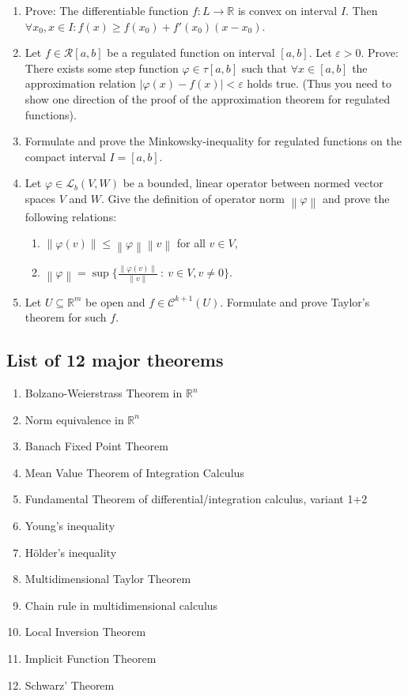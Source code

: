 \documentclass{article}
\newcommand{\norm}[1]{\left\|#1\right\|}
\newcommand{\card}[1]{\left|#1\right|}
\begin{document}
\begin{enumerate}
  \item Prove: The differentiable function $f: L \to \mathbb R$ is convex on interval $I$. Then $\forall x_0, x \in I: f(x) \geq f(x_0) + f'(x_0)(x - x_0)$.
  \item Let $f \in \mathcal R[a, b]$ be a regulated function on interval $[a, b]$. Let $\varepsilon > 0$. Prove: There exists some step function $\varphi \in \tau[a, b]$ such that $\forall x \in [a, b]$ the approximation relation $\card{\varphi(x) - f(x)} < \varepsilon$ holds true. (Thus you need to show one direction of the proof of the approximation theorem for regulated functions).
  \item Formulate and prove the Minkowsky-inequality for regulated functions on the compact interval $I = [a, b]$.
  \item Let $\varphi \in \mathcal L_b(V, W)$ be a bounded, linear operator between normed vector spaces $V$ and $W$. Give the definition of operator norm $\norm{\varphi}$ and prove the following relations:
    \begin{enumerate}
      \item $\norm{\varphi(v)} \leq \norm{\varphi} \norm{v}$ for all $v \in V$,
      \item $\norm{\varphi} = \sup\Big\{\frac{\norm{\varphi(v)}}{\norm{v}} \: : \: v \in V, v \neq 0\Big\}$.
    \end{enumerate}
  \item Let $U \subseteq \mathbb R^m$ be open and $f \in \mathcal C^{k+1}(U)$. Formulate and prove Taylor's theorem for such $f$.
\end{enumerate}

\subsection{List of 12 major theorems}

\begin{enumerate}
  \item Bolzano-Weierstrass Theorem in $\mathbb R^n$
  \item Norm equivalence in $\mathbb R^n$
  \item Banach Fixed Point Theorem
  \item Mean Value Theorem of Integration Calculus
  \item Fundamental Theorem of differential/integration calculus, variant 1+2
  \item Young's inequality
  \item H\"older's inequality
  \item Multidimensional Taylor Theorem
  \item Chain rule in multidimensional calculus
  \item Local Inversion Theorem
  \item Implicit Function Theorem
  \item Schwarz' Theorem
\end{enumerate}
\end{document}
